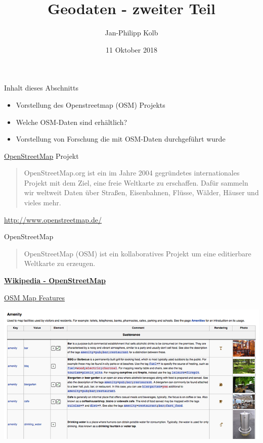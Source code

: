 \documentclass[ignorenonframetext,]{beamer}
\title{Geodaten - zweiter Teil}
\author{Jan-Philipp Kolb}
\date{11 Oktober 2018}
\providecommand{\tightlist}{%
  \setlength{\itemsep}{0pt}\setlength{\parskip}{0pt}}
\begin{document}
\frame{\titlepage}

\begin{frame}{Inhalt dieses Abschnitts}

\begin{itemize}
\tightlist
\item
  Vorstellung des Openstreetmap (OSM) Projekts
\item
  Welche OSM-Daten sind erhältlich?
\item
  Vorstellung von Forschung die mit OSM-Daten durchgeführt wurde
\end{itemize}

\end{frame}

\begin{frame}{\href{http://www.openstreetmap.de/}{OpenStreetMap}
Projekt}

\begin{quote}
OpenStreetMap.org ist ein im Jahre 2004 gegründetes internationales
Projekt mit dem Ziel, eine freie Weltkarte zu erschaffen. Dafür sammeln
wir weltweit Daten über Straßen, Eisenbahnen, Flüsse, Wälder, Häuser und
vieles mehr.
\end{quote}

\url{http://www.openstreetmap.de/}

\end{frame}

\begin{frame}{OpenStreetMap}

\begin{quote}
OpenStreetMap (OSM) ist ein kollaboratives Projekt um eine editierbare
Weltkarte zu erzeugen.
\end{quote}

\href{https://en.wikipedia.org/wiki/OpenStreetMap}{\textbf{Wikipedia -
OpenStreetMap}}

\end{frame}

\begin{frame}{\href{http://wiki.openstreetmap.org/wiki/DE:Map_Features}{OSM
Map Features}}

\includegraphics{figure/osm_mapfeatures.png}

\end{frame}
\end{document}
